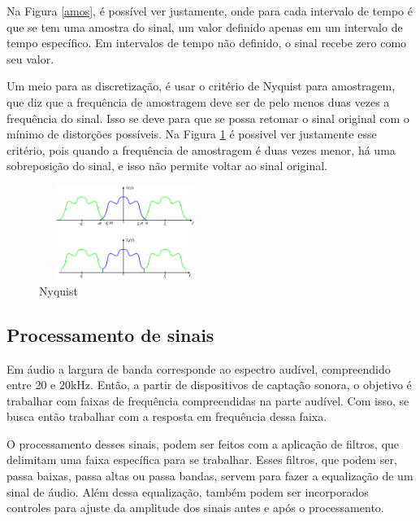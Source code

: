 \documentclass[conference]{IEEEtran}
\begin{document}
Na Figura \ref{amos}, é possível ver justamente, onde para cada intervalo de tempo é que se tem uma amostra do sinal, um valor definido apenas em um intervalo de tempo específico. Em intervalos de tempo não definido, o sinal recebe zero como seu valor.

Um meio para as discretização, é usar o critério de Nyquist para amostragem, que diz que a frequência de amostragem deve ser de pelo menos duas vezes a frequência do sinal. Isso se deve para que se possa retomar o sinal original com o mínimo de distorções possíveis. 
Na Figura \ref{fig_sim} é possivel ver justamente esse critério, pois quando a frequência de amostragem é duas vezes menor, há uma sobreposição do sinal, e isso não permite voltar ao sinal original. \cite{Linhares:1968}

\begin{figure}[!htb]
\centering
\includegraphics[width=2.2in, height = 1.2in]{Imagens/nyquist}
\caption{Nyquist}

\label{fig_sim}
\end{figure}

\subsection{Processamento de sinais}

Em áudio a largura de banda corresponde ao espectro audível, compreendido entre 20 e 20kHz. %
\cite{Linhares:1968}
Então, a partir de dispositivos de captação sonora, o objetivo é trabalhar com faixas de frequência compreendidas na parte audível. Com isso, se busca então trabalhar com a resposta em frequência dessa faixa.

O processamento desses sinais, podem ser feitos com a aplicação de filtros, que delimitam uma faixa específica para se trabalhar. Esses filtros, que podem ser, passa baixas, passa altas ou passa bandas, servem para fazer a equalização de um sinal de áudio. Além dessa equalização, também podem ser incorporados controles para ajuste da amplitude dos sinais antes e após o processamento.
\end{document}
